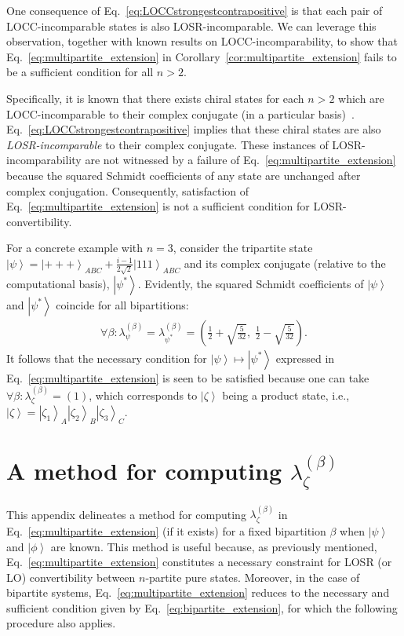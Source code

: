 \documentclass[12pt]{article}
\newcommand{\ket}[1]{\left| #1 \right>}
\theoremstyle{plain}
\theoremstyle{definition}
\begin{document}
\begin{appendices}
One consequence of Eq.~\eqref{eq:LOCCstrongestcontrapositive} is that each pair of LOCC-incomparable states is also LOSR-incomparable. We can leverage this observation, together with known results on LOCC-incomparability, to show that Eq.~\eqref{eq:multipartite_extension} in Corollary~\ref{cor:multipartite_extension} fails to be a sufficient condition for all $n > 2$.

Specifically, it is known that there exists chiral states for each $n > 2$ which are LOCC-incomparable to their complex conjugate (in a particular basis)~\cite{bennett2000exact,Kraus2010Local}. Eq.~\eqref{eq:LOCCstrongestcontrapositive} implies that these chiral states are also {\em LOSR-incomparable} to their complex conjugate. These instances of LOSR-incomparability are not witnessed by a failure of Eq.~\eqref{eq:multipartite_extension}
 because the squared Schmidt coefficients of any state are unchanged after complex conjugation. Consequently, satisfaction of Eq.~\eqref{eq:multipartite_extension} is not a sufficient condition for LOSR-convertibility.


For a concrete example with $n=3$,
  consider the tripartite state $\ket{\psi} = \ket{+++}_{ABC} + \frac{i - 1}{2 \sqrt{2}} \ket{111}_{ABC}$ and its complex conjugate (relative to the computational basis), $\ket{\psi^{\ast}}$. Evidently, the squared Schmidt coefficients of $\ket{\psi}$ and $\ket{\psi^{\ast}}$ 
 coincide for all bipartitions:
\begin{align} \label{psipsistar}
    \forall \beta : \lambda^{(\beta)}_{\psi} = \lambda^{(\beta)}_{\psi^{\ast}} = \left(\tfrac12 + \sqrt{\tfrac{5}{32}},\;\tfrac12 - \sqrt{\tfrac{5}{32}}\right).
\end{align}
It follows that the necessary condition for $\ket{\psi} \mapsto \ket{\psi^{\ast}}$ expressed in Eq.~\eqref{eq:multipartite_extension} is seen to be satisfied because one can take $\forall \beta: \lambda_{\zeta}^{(\beta)} = (1)$, which corresponds to $\ket{\zeta}$ being a product state,
  i.e., $\ket{\zeta} = \ket{\zeta_1}_A\ket{\zeta_2}_B\ket{\zeta_3}_C$. 

\section{A method for computing $\lambda_{\zeta}^{(\beta)}$} \label{alg}

This appendix delineates a method for computing $\lambda_{\zeta}^{(\beta)}$ in Eq.~\eqref{eq:multipartite_extension} (if it exists) for a fixed bipartition $\beta$ when $\ket{\psi}$ and $\ket{\phi}$ are known. This method is useful because, as previously mentioned, Eq.~\eqref{eq:multipartite_extension} constitutes a necessary constraint for LOSR (or LO) convertibility between $n$-partite pure states.
Moreover, in the case of bipartite systems, Eq.~\eqref{eq:multipartite_extension} reduces to the necessary and sufficient condition given by Eq.~\eqref{eq:bipartite_extension}, for which the following procedure also applies.


\end{appendices}
\end{document}
